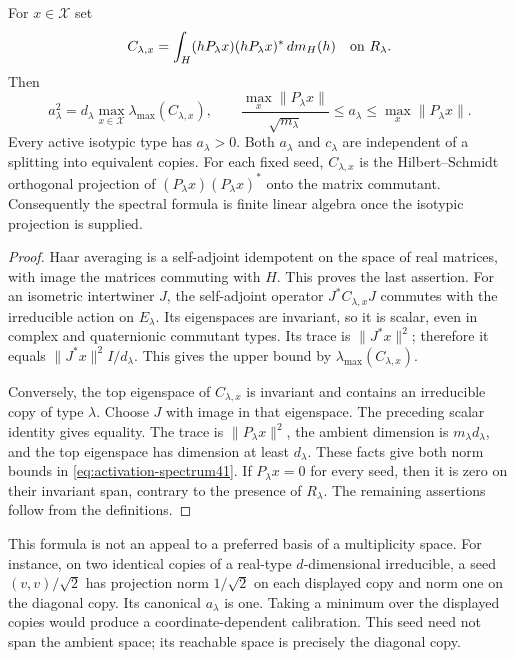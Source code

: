 \begin{proposition}\label{prop:activation41}
For $x\in\mathcal X$ set
\[
 C_{\lambda,x}=\int_H(hP_\lambda x)(hP_\lambda x)^*\,dm_H(h)
                       \quad\hbox{on }R_\lambda.
\]
Then
\begin{equation}\label{eq:activation-spectrum41}
 a_\lambda^2=d_\lambda\max_{x\in\mathcal X}
                         \lambda_{\max}(C_{\lambda,x}),
 \qquad
 \frac{\max_x\|P_\lambda x\|}{\sqrt{m_\lambda}}
           \le a_\lambda\le\max_x\|P_\lambda x\|.
\end{equation}
Every active isotypic type has $a_\lambda>0$. Both $a_\lambda$ and
$c_\lambda$ are independent of a splitting into equivalent copies.
For each fixed seed, $C_{\lambda,x}$ is the Hilbert--Schmidt orthogonal
projection of $(P_\lambda x)(P_\lambda x)^*$ onto the matrix commutant.
Consequently the spectral formula is finite linear algebra once the
isotypic projection is supplied.
\end{proposition}
\begin{proof}
Haar averaging is a self-adjoint idempotent on the space of real
matrices, with image the matrices commuting with $H$. This proves the
last assertion. For an isometric intertwiner $J$, the self-adjoint
operator $J^*C_{\lambda,x}J$ commutes with the irreducible action on
$E_\lambda$. Its eigenspaces are invariant, so it is scalar, even in
complex and quaternionic commutant types. Its trace is $\|J^*x\|^2$;
therefore it equals $\|J^*x\|^2I/d_\lambda$. This gives the upper
bound by $\lambda_{\max}(C_{\lambda,x})$.

Conversely, the top eigenspace of $C_{\lambda,x}$ is invariant and
contains an irreducible copy of type $\lambda$. Choose $J$ with image
in that eigenspace. The preceding scalar identity gives equality.
The trace is $\|P_\lambda x\|^2$, the ambient dimension is
$m_\lambda d_\lambda$, and the top eigenspace has dimension at least
$d_\lambda$. These facts give both norm bounds in
\eqref{eq:activation-spectrum41}. If $P_\lambda x=0$ for every seed,
then it is zero on their invariant span, contrary to the presence of
$R_\lambda$. The remaining assertions follow from the definitions.
\end{proof}

This formula is not an appeal to a preferred basis of a multiplicity
space. For instance, on two identical copies of a real-type $d$-dimensional
irreducible, a seed $(v,v)/\sqrt2$ has projection norm $1/\sqrt2$ on
each displayed copy and norm one on the diagonal copy. Its canonical
$a_\lambda$ is one. Taking a minimum over the displayed copies would
produce a coordinate-dependent calibration. This seed need not span
the ambient space; its reachable space is precisely the diagonal copy.

